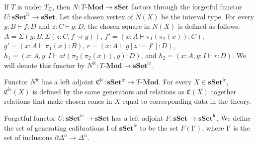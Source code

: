 \documentclass[reqno]{amsart}
\theoremstyle{definition}
\theoremstyle{remark}
\newcommand{\repl}{:=}
\newcommand{\idtype}{\rightsquigarrow}
\newcommand{\cat}[1]{\mathbf{#1}}
\newcommand{\Mod}[1]{#1\text{-}\cat{Mod}}
\newcommand{\sSet}{\cat{sSet}}
\newcommand{\lcsSet}{\sSet^{\mathrm{lc}}}
\newcommand{\lcN}{N^{\mathrm{lc}}}
\newcommand{\lcC}{\mathfrak{C}^{\mathrm{lc}}}
\newcommand{\I}{\mathrm{I}}
\numberwithin{figure}{section}
\begin{document}
If $T$ is under $T_\Sigma$, then $N : \Mod{T} \to \sSet$ factors through the forgetful functor $U : \lcsSet \to \sSet$.
Let the chosen vertex of $N(X)$ be the interval type.
For every $y : B \vdash f : D$ and $z : C \vdash g : D$, the chosen square in $N(X)$ is defined as follows:
$A = \Sigma(y : B, \Sigma(z : C, f \idtype g))$, $f' = (x : A \vdash \pi_1(\pi_2(x)) : C)$, $g' = (x : A \vdash \pi_1(x) : B)$,
$r = (x : A \vdash g[z \repl f'] : D)$, $h_1 = (x : A, y : I \vdash at(\pi_2(\pi_2(x)),y) : D)$, and $h_2 = (x : A, y : I \vdash r : D)$.
We will denote this functor by $\lcN : \Mod{T} \to \lcsSet$.

Functor $\lcN$ has a left adjoint $\lcC : \lcsSet \to \Mod{T}$.
For every $X \in \lcsSet$, $\lcC(X)$ is defined by the same generators and relations as $\mathfrak{C}(X)$
together relations that make chosen cones in $X$ equal to corresponding data in the theory.

Forgetful functor $U : \lcsSet \to \sSet$ has a left adjoint $F : \sSet \to \lcsSet$.
We define the set of generating cofibrations $\I$ of $\lcsSet$ to be the set $F(\I')$, where $\I'$ is the set of inclusions $\partial \Delta^n \to \Delta^n$.



\end{document}
